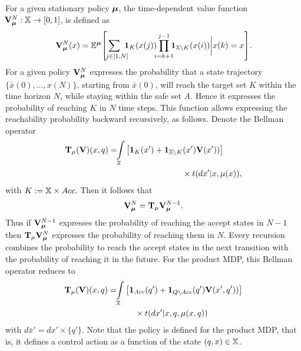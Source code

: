 \documentclass{ifacconf}
\newcommand{\new}[1]{{\color{blue}#1}}
\newcommand{\ind}{\mathbf{1}}
\begin{document}
\new{
For a given stationary
policy ${\boldsymbol{\mu}}$, the time-dependent value function $\!\mathbf V_{\boldsymbol{\mu}}^N:{\mathbb{X}}\rightarrow [0,1]$,  is defined as 
\begin{align}\mathbf V^N_\polb(\bar x)=\mathbb{E}^\polb\!\left[\,\sum\limits_{\mathclap{\ \  j\in [1,N]}} \,\, \ind_K(\bar x(j)) \prod\limits_{\mathclap{i=k+1}}^{j-1}\ind_{\bar{\X}\setminus K}(\bar x(i))\bigg|\bar x(k)=\bar x\right]\!.\label{eq:Valfunc}\end{align}
For a given policy $\mathbf V_{\boldsymbol{\mu}}^N$ 
expresses the probability that a state trajectory $\{\bar x({0}),\ldots, x({N})\}$,
starting from $\bar x({0})$, will reach the target set $K$ within the time horizon $N$,
while staying within the safe set $A$. 
Hence it expresses the probability of reaching $K$ in $N$ time steps.}
%
\new{This function allows expressing the  reachability probability backward recursively,
as follows. 
Denote the Bellman operator
\begin{align}\label{eq:V_recopt_inf}
& \Bel_\pol (\mathbf  V)(x,q) =\!\!\int_{\bar\X}  \left[\mathbf 1_{K}(\bar x')+  \mathbf 1_{\bar \X\setminus K}( \bar x')\mathbf V( \bar x'))\right]\notag\\&\hspace{5cm}\hfill 
\times \bar{\tr}(d \bar x' |\bar x,\pol(\bar x)),
\end{align}
with $K:={\mathbb{X}} \times Acc$.
Then it follows that 
\begin{align}
\mathbf V_{\boldsymbol{\mu}}^{N} = 
 {\mathbf {T}}_{\mu} \mathbf V_{\boldsymbol{\mu}}^{N-1}  .\end{align}
Thus if $\mathbf V_{\boldsymbol{\mu}}^{N-1} $ expresses the probability of reaching the accept states in $N-1$ then $ {\mathbf {T}}_{\mu} \mathbf V_{\boldsymbol{\mu}}^{N} $ expresses the probability of reaching them in $N$.
Every recursion combines the probability to reach the accept states in the next transition with the probability of reaching it in the future.
For the product MDP, this Bellman operator reduces to 
\begin{align}\label{eq:V_recopt_inf_mu}
& \Bel_\pol (\mathbf V)(x,q) =\!\!\int_{\bar\X}  \left[\mathbf 1_{Acc}(q')+  \mathbf 1_{Q\setminus Acc}( q')\mathbf V( x', q'))\right]\notag\\&\hspace{3cm}\hfill 
\times \bar{\tr}(d \bar x' |x,q,\pol(x,q))
\end{align}
with $d \bar x'= d x'\times\{q'\}$. Note that the policy is defined for the product MDP, that is, it defines a control action as a function of the state $(q,x)\in\relax{\mathbb{X}}$.}
 
\end{document}
